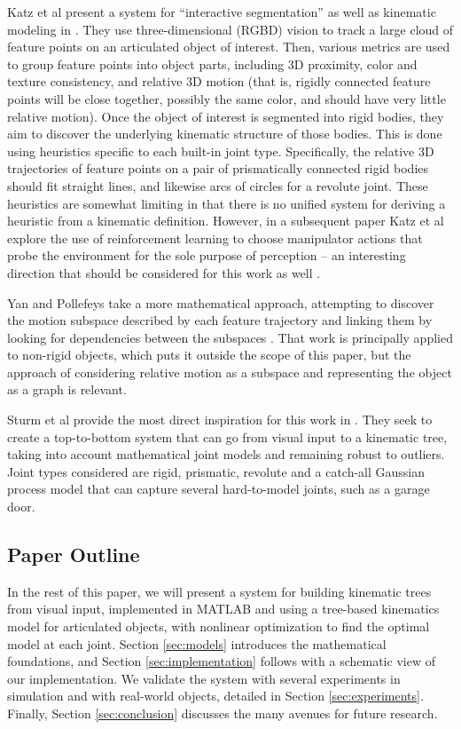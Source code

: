 \documentclass[letterpaper, 10 pt, conference]{ieeeconf}  %
\begin{document}
Katz et al present a system for ``interactive segmentation'' as well as kinematic modeling in \cite{Katz2008}. They use three-dimensional (RGBD) vision to track a large cloud of feature points on an articulated object of interest. Then, various metrics are used to group feature points into object parts, including 3D proximity, color and texture consistency, and relative 3D motion (that is, rigidly connected feature points will be close together, possibly the same color, and should have very little relative motion). Once the object of interest is segmented into rigid bodies, they aim to discover the underlying kinematic structure of those bodies. This is done using heuristics specific to each built-in joint type. Specifically, the relative 3D trajectories of feature points on a pair of prismatically connected rigid bodies should fit straight lines, and likewise arcs of circles for a revolute joint. These heuristics are somewhat limiting in that there is no unified system for deriving a heuristic from a kinematic definition. However, in a subsequent paper Katz et al explore the use of reinforcement learning to choose manipulator actions that probe the environment for the sole purpose of perception -- an interesting direction that should be considered for this work as well \cite{Katz2008a}.

Yan and Pollefeys take a more mathematical approach, attempting to discover the motion subspace described by each feature trajectory and linking them by looking for dependencies between the subspaces \cite{Yan2006}. That work is principally applied to non-rigid objects, which puts it outside the scope of this paper, but the approach of considering relative motion as a subspace and representing the object as a graph is relevant.

Sturm et al provide the most direct inspiration for this work in \cite{Sturm2011}. They seek to create a top-to-bottom system that can go from visual input to a kinematic tree, taking into account mathematical joint models and remaining robust to outliers. Joint types considered are rigid, prismatic, revolute and a catch-all Gaussian process model that can capture several hard-to-model joints, such as a garage door.

\subsection{Paper Outline}

In the rest of this paper, we will present a system for building kinematic trees from visual input, implemented in MATLAB and using a tree-based kinematics model for articulated objects, with nonlinear optimization to find the optimal model at each joint. Section \ref{sec:models} introduces the mathematical foundations, and Section \ref{sec:implementation} follows with a schematic view of our implementation. We validate the system with several experiments in simulation and with real-world objects, detailed in Section \ref{sec:experiments}. Finally, Section \ref{sec:conclusion} discusses the many avenues for future research.
\end{document}
